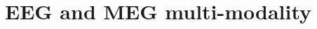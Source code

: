 \chapter[\texorpdfstring{EEG and MEG multi-modality 
    }{EEG and MEG multi-modality}
]{EEG and MEG multi-modality}
\label{chptr:Multimodality}
\minitoc